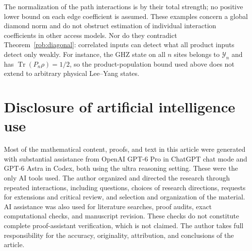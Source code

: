 \documentclass[reqno]{amsart}
\theoremstyle{definition}
\theoremstyle{remark}
\DeclareMathOperator{\Tr}{Tr}
\begin{document}
The normalization of the path interactions is by their total strength;
no positive lower bound on each edge coefficient is assumed.  These
examples concern a global diamond norm and do not obstruct estimation
of individual interaction coefficients in other access models.
Nor do they contradict Theorem~\ref{rob:diagonal}: correlated inputs
can detect what all product inputs detect only weakly.  For instance,
the GHZ state on all $n$ sites belongs to $\mathcal Y_n$ and has
$\Tr(P_n\rho)=1/2$, so the product-population bound used above does not
extend to arbitrary physical Lee--Yang states.


\section*{Disclosure of artificial intelligence use}
Most of the mathematical content, proofs, and text in this article
were generated with substantial assistance from
OpenAI GPT-6 Pro in ChatGPT chat mode and GPT-6 Astra in Codex, both
using the ultra reasoning setting. These were the only AI tools used.
The author organized and directed the research through repeated
interactions, including questions, choices of research directions,
requests for extensions and critical review, and selection and
organization of the material. AI assistance was also used for
literature searches, proof audits, exact computational checks, and
manuscript revision. These checks do not constitute complete
proof-assistant verification, which is not claimed.
The author takes full responsibility for the accuracy, originality,
attribution, and conclusions of the article.
\end{document}

